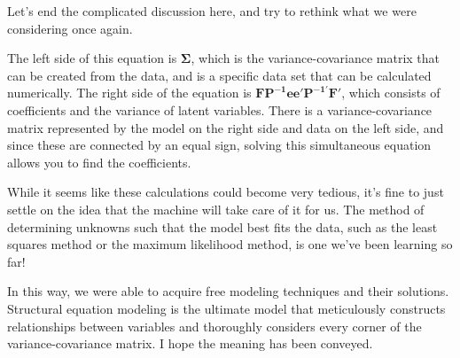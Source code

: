 \documentclass{ltjsbook}
\begin{document}
Let's end the complicated discussion here, and try to rethink what we were considering once again.

The left side of this equation is $\bm{\Sigma}$, which is the variance-covariance matrix that can be created from the data, and is a specific data set that can be calculated numerically. The right side of the equation is $\bm{ FP^{-1} ee' P^{-1'} F' } $, which consists of coefficients and the variance of latent variables. There is a variance-covariance matrix represented by the model on the right side and data on the left side, and since these are connected by an equal sign, solving this simultaneous equation allows you to find the coefficients.

While it seems like these calculations could become very tedious, it's fine to just settle on the idea that the machine will take care of it for us. The method of determining unknowns such that the model best fits the data, such as the least squares method or the maximum likelihood method, is one we've been learning so far!

In this way, we were able to acquire free modeling techniques and their solutions. Structural equation modeling is the ultimate model that meticulously constructs relationships between variables and thoroughly considers every corner of the variance-covariance matrix. I hope the meaning has been conveyed.

\end{document}
